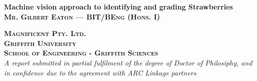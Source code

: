 \documentclass[fleqn,twoside]{article}
\begin{document}
\raggedbottom

\begin{titlepage}


\newcommand{\HRule}{\rule{\linewidth}{0.5mm}} %
 
\begin{flushleft} 
 



{ \Huge \bfseries Machine vision approach to identifying and grading Strawberries}\\[1.5cm] %


\textsc{\Large \bfseries Mr. Gilbert Eaton --- BIT/BEng (Hons. I)}\\[0.5cm] %
 
 
 
\vspace{10mm} 



\textsc{\Large \bfseries Magnificent Pty. Ltd.}\\[0.5cm] %
\textsc{\Large \bfseries Griffith University}\\[0.5cm] %
\textsc{\Large \bfseries School of Engineering - Griffith Sciences}\\[1.5cm] %


\emph{A report submitted in partial fulfilment of the degree of Doctor of Philosiphy, and in confidence due to the agreement with ARC Linkage partners}\\[1.5cm]




\end{flushleft}

\vfill %

\end{titlepage}
\end{document}
